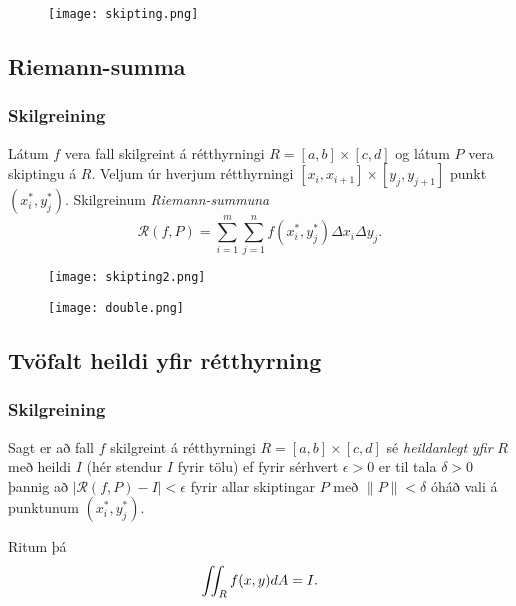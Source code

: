 \bigskip
 \begin{figure}[h!]
 \centering
            \texttt{[image: skipting.png]}
            \caption*{}
\end{figure}



\subsection{Riemann-summa} 

\subsubsection{Skilgreining }
  
 Látum $f$ vera fall skilgreint á rétthyrningi $R=[a,b]\times[c,d]$ og
 látum $P$ vera skiptingu á $R$.  Veljum úr hverjum rétthyrningi
 $[x_i,x_{i+1}]\times [y_j,y_{j+1}]$ punkt $(x_i^*, y_j^*)$.  
Skilgreinum \emph{Riemann-summuna}
$$\mathcal{R}(f,P)=\sum_{i=1}^m\sum_{j=1}^n f(x_i^*, y_j^*)\Delta x_i\Delta
  y_j.$$

   \begin {figure}[h!]
 \centering
            \texttt{[image: skipting2.png]}
            \caption*{}
\end {figure}




    \begin {figure}[h!]
 \centering
            \texttt{[image: double.png]}
            \caption*{}
\end {figure}



\subsection{\nopagebreak Tvöfalt heildi yfir rétthyrning} 

\subsubsection{\nopagebreak Skilgreining }
Sagt er að fall $f$ skilgreint á
rétthyrningi $R=[a,b]\times [c,d]$ sé {\em heildanlegt yfir} $R$ með
heildi $I$ (hér stendur $I$ fyrir tölu) ef fyrir sérhvert
$\epsilon>0$ er til tala $\delta>0$ 
þannig að $|\mathcal{R}(f,P)-I|<\epsilon$ fyrir allar skiptingar $P$ með
$\|P\|<\delta$ óháð vali á punktunum $(x_i^*, y_j^*)$.

Ritum þá 
$$\int\!\!\!\int_R f(x,y)dA=I.$$






